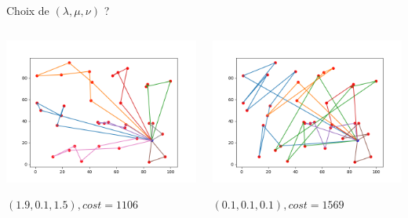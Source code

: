 \documentclass{beamer}
\begin{document}
\begin{frame}{Choix de $(\lambda,\mu,\nu)$ ?}
\begin{columns}[t]

  \begin{column}{4cm}
  	\centering
	\includegraphics[scale=0.27]{resCW190105.png}
 
 	$(1.9,0.1,1.5), cost = 1106$
  \end{column}
  
 
  \begin{column}{4cm}
  	\centering
	\includegraphics[scale=0.27]{resCW111.png}
	
	$(0.1,0.1,0.1), cost = 1569$
  \end{column}
  



\end{columns}
\end{frame}
\end{document}
